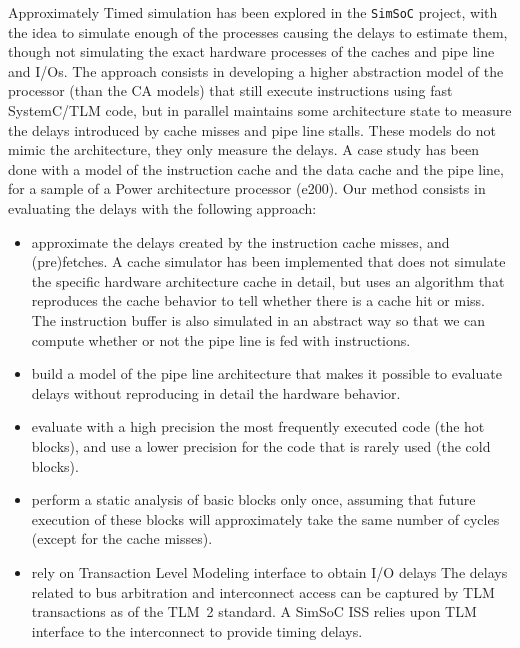 \documentclass{llncs}
\newcommand{\simsoc}{\texttt{SimSoC}\xspace}
\begin{document}
Approximately Timed simulation has been explored in the \simsoc
project, with the idea to simulate enough of the processes causing the
delays to estimate them, though not simulating the exact hardware
processes of the caches and pipe line and I/Os. The approach consists
in developing a higher abstraction model of the processor (than the CA
models) that still execute instructions using fast SystemC/TLM code,
but in parallel maintains some architecture state to measure the
delays introduced by cache misses and pipe line stalls. These models
do not mimic the architecture, they only measure the delays.  A case
study has been done with a model of the instruction cache and the data
cache and the pipe line, for a sample of a Power architecture
processor (e200). Our method consists in evaluating the delays with the
following approach:
\begin{itemize}
\item approximate the delays created by the instruction cache misses,
  and (pre)fetches. A cache simulator has been implemented  that does
  not simulate the specific hardware architecture cache in detail, but
  uses an algorithm that reproduces the cache behavior to tell whether
  there is a cache hit or miss. The instruction buffer is also
  simulated in an abstract way so that we can compute whether or not
  the pipe line is fed with instructions.
\item build a model of the pipe line architecture that makes it possible
to evaluate delays without reproducing in detail the hardware behavior.
\item evaluate with a high precision the most frequently executed
  code (the hot blocks), and use a lower precision for the code that
  is rarely used (the cold blocks).
\item perform a static analysis of basic blocks only once, assuming
  that future execution of these blocks will approximately take the
  same number of cycles (except for the cache misses).
\item rely on Transaction Level Modeling interface to obtain I/O delays
The delays related to bus arbitration and interconnect access can be
captured by TLM transactions as of the TLM~2 standard. A SimSoC ISS
relies upon TLM interface to the interconnect to provide timing
delays.
\end{itemize}
\end{document}

